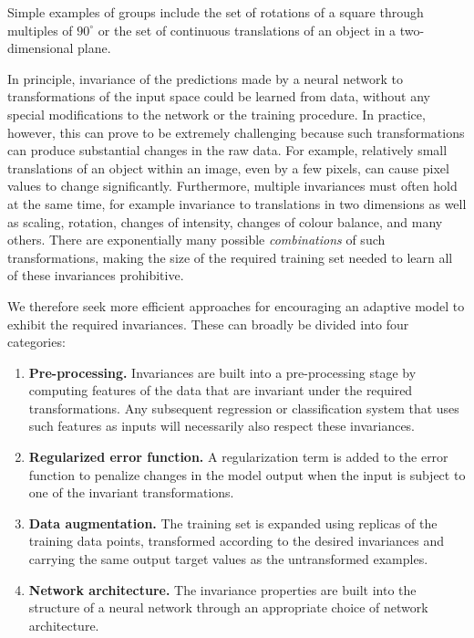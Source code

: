 \documentclass{article}
\begin{document}
Simple examples of groups include the set of rotations of a square through multiples of $90^\circ$ or the set of continuous translations of an object in a two-dimensional plane.

In principle, invariance of the predictions made by a neural network to transformations of the input space could be learned from data, without any special modifications to the network or the training procedure. In practice, however, this can prove to be extremely challenging because such transformations can produce substantial changes in the raw data. For example, relatively small translations of an object within an image, even by a few pixels, can cause pixel values to change significantly. Furthermore, multiple invariances must often hold at the same time, for example invariance to translations in two dimensions as well as scaling, rotation, changes of intensity, changes of colour balance, and many others. There are exponentially many possible \emph{combinations} of such transformations, making the size of the required training set needed to learn all of these invariances prohibitive.

We therefore seek more efficient approaches for encouraging an adaptive model to exhibit the required invariances. These can broadly be divided into four categories:

\begin{enumerate}
    \item \textbf{Pre-processing.} Invariances are built into a pre-processing stage by computing features of the data that are invariant under the required transformations. Any subsequent regression or classification system that uses such features as inputs will necessarily also respect these invariances.
    
    \item \textbf{Regularized error function.} A regularization term is added to the error function to penalize changes in the model output when the input is subject to one of the invariant transformations.
    
    \item \textbf{Data augmentation.} The training set is expanded using replicas of the training data points, transformed according to the desired invariances and carrying the same output target values as the untransformed examples.
    
    \item \textbf{Network architecture.} The invariance properties are built into the structure of a neural network through an appropriate choice of network architecture.
\end{enumerate}
\end{document}
